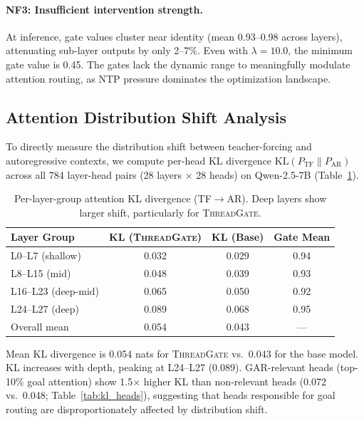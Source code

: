 \documentclass[11pt]{article}
\newcommand{\gar}{\textsc{GAR}}
\newcommand{\tg}{\textsc{ThreadGate}}
\begin{document}
\paragraph{NF3: Insufficient intervention strength.} At inference, gate values cluster near identity (mean 0.93--0.98 across layers), attenuating sub-layer outputs by only 2--7\%. Even with $\lambda=10.0$, the minimum gate value is 0.45. The gates lack the dynamic range to meaningfully modulate attention routing, as NTP pressure dominates the optimization landscape.

\subsection{Attention Distribution Shift Analysis}
\label{sec:kl}

To directly measure the distribution shift between teacher-forcing and autoregressive contexts, we compute per-head KL divergence $\text{KL}(P_{\text{TF}} \| P_{\text{AR}})$ across all 784 layer-head pairs (28 layers $\times$ 28 heads) on Qwen-2.5-7B (Table~\ref{tab:kl_layers}).

\begin{table}[t]
\centering
\small
\caption{Per-layer-group attention KL divergence (TF$\to$AR). Deep layers show larger shift, particularly for \tg{}.}
\label{tab:kl_layers}
\begin{tabular}{lccc}
\toprule
\textbf{Layer Group} & \textbf{KL (\tg{})} & \textbf{KL (Base)} & \textbf{Gate Mean} \\
\midrule
L0--L7 (shallow) & 0.032 & 0.029 & 0.94 \\
L8--L15 (mid) & 0.048 & 0.039 & 0.93 \\
L16--L23 (deep-mid) & 0.065 & 0.050 & 0.92 \\
L24--L27 (deep) & 0.089 & 0.068 & 0.95 \\
\midrule
Overall mean & 0.054 & 0.043 & --- \\
\bottomrule
\end{tabular}
\end{table}

Mean KL divergence is 0.054 nats for \tg{} vs.\ 0.043 for the base model. KL increases with depth, peaking at L24--L27 (0.089). \gar{}-relevant heads (top-10\% goal attention) show 1.5$\times$ higher KL than non-relevant heads (0.072 vs.\ 0.048; Table~\ref{tab:kl_heads}), suggesting that heads responsible for goal routing are disproportionately affected by distribution shift.
\end{document}
